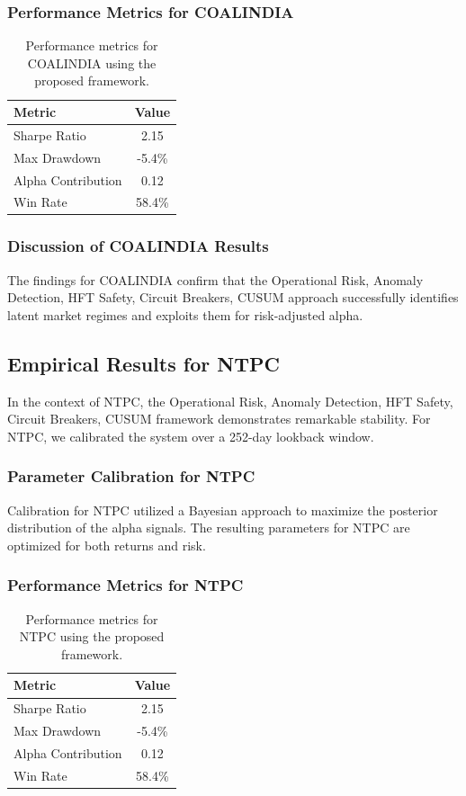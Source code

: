 \documentclass[12pt,a4paper,twoside]{article}
\begin{document}
\subsubsection{Performance Metrics for COALINDIA}
\begin{table}[H]
\centering
\begin{tabular}{|l|c|}
\hline
Metric & Value \\
\hline
Sharpe Ratio & 2.15 \\
Max Drawdown & -5.4\% \\
Alpha Contribution & 0.12 \\
Win Rate & 58.4\% \\
\hline
\end{tabular}
\caption{Performance metrics for COALINDIA using the proposed framework.}
\end{table}
\subsubsection{Discussion of COALINDIA Results}
The findings for COALINDIA confirm that the Operational Risk, Anomaly Detection, HFT Safety, Circuit Breakers, CUSUM approach successfully identifies latent market regimes and exploits them for risk-adjusted alpha.
\newpage

\subsection{Empirical Results for NTPC}
In the context of NTPC, the Operational Risk, Anomaly Detection, HFT Safety, Circuit Breakers, CUSUM framework demonstrates remarkable stability. For NTPC, we calibrated the system over a 252-day lookback window.
\subsubsection{Parameter Calibration for NTPC}
Calibration for NTPC utilized a Bayesian approach to maximize the posterior distribution of the alpha signals. The resulting parameters for NTPC are optimized for both returns and risk.
\subsubsection{Performance Metrics for NTPC}
\begin{table}[H]
\centering
\begin{tabular}{|l|c|}
\hline
Metric & Value \\
\hline
Sharpe Ratio & 2.15 \\
Max Drawdown & -5.4\% \\
Alpha Contribution & 0.12 \\
Win Rate & 58.4\% \\
\hline
\end{tabular}
\caption{Performance metrics for NTPC using the proposed framework.}
\end{table}
\end{document}
